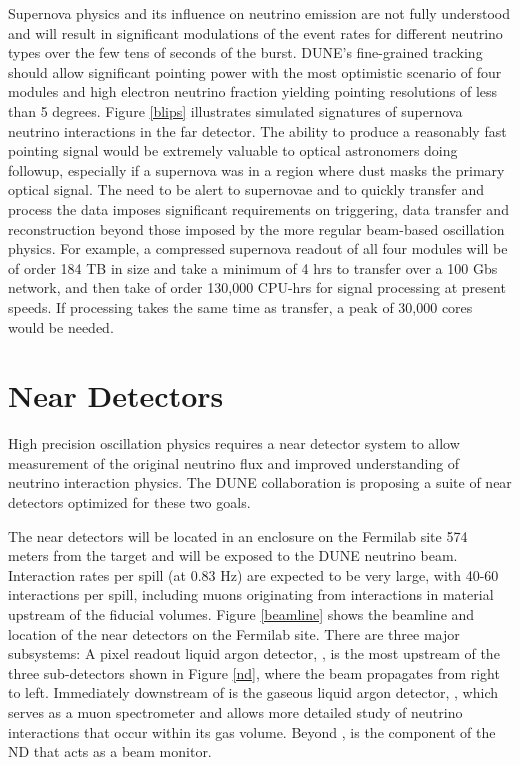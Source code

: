 \documentclass[../main-v1.tex]{subfiles}
\begin{document}
Supernova physics and its influence on neutrino emission are not fully understood and will result in significant modulations of the event rates for different neutrino types  over the few tens of seconds of the burst.  DUNE's fine-grained tracking should allow significant pointing power with the most optimistic scenario of four modules and high electron neutrino fraction yielding pointing resolutions of less than 5 degrees.   Figure \ref{blips} illustrates simulated signatures of supernova neutrino interactions in the far detector. The ability to produce a reasonably fast pointing signal would be extremely valuable to optical astronomers doing followup, especially if a supernova was in a region where dust masks the primary optical signal.   The need to be alert to supernovae and to quickly transfer and process the data imposes significant requirements on triggering, data transfer and reconstruction beyond those imposed by the more regular beam-based oscillation physics.   For example, a compressed supernova readout of all four modules will be of order 184 TB in size and take a minimum of 4 hrs to transfer over a 100 Gbs network,  and then take of order 130,000 CPU-hrs for signal processing at present speeds.  If processing takes the same time as transfer, a peak of 30,000 cores would be needed. 

\section{Near Detectors }

High precision oscillation physics requires a near detector system to allow measurement of the original neutrino flux and improved understanding of neutrino interaction physics.  The DUNE  collaboration is proposing a suite of near detectors optimized for these two goals. 
 
 The near detectors will be located in an enclosure on the Fermilab site 574 meters from the target and will be exposed to the DUNE neutrino beam.    Interaction rates per spill (at 0.83 Hz) are expected to be very large, with 40-60 interactions per spill, including muons originating from interactions in material upstream of the fiducial volumes. Figure \ref{beamline} shows the beamline and location of the near detectors on the Fermilab site. There are three major subsystems:
 A pixel readout liquid argon detector, , is  the most upstream of the three sub-detectors shown in Figure \ref{nd}, where the beam propagates  from right to left. Immediately downstream of  is the gaseous liquid argon detector, , which serves  as  a muon spectrometer and allows more detailed study of neutrino interactions that occur within its gas volume. Beyond , is the  component of the ND that acts as a beam monitor. %
 
\end{document}
